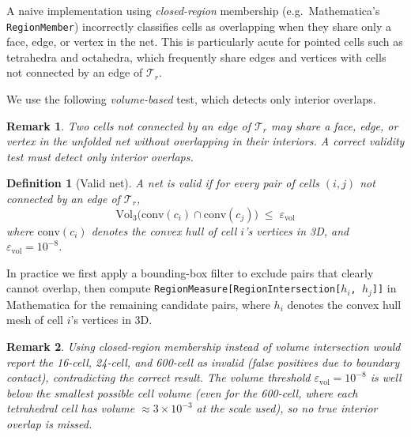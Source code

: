 \documentclass[11pt,letterpaper]{article}
\newtheorem{remark}{Remark}
\newtheorem{definition}{Definition}
\newcommand{\eps}{\varepsilon}
\begin{document}

A naive implementation using \emph{closed-region} membership
(e.g.\ Mathematica's \texttt{RegionMember}) incorrectly classifies
cells as overlapping when they share only a face, edge, or vertex
in the net.
This is particularly acute for pointed cells such as tetrahedra and
octahedra, which frequently share edges and vertices with
cells not connected by an edge of $\mathcal{T}_r$.

We use the following \emph{volume-based} test, which detects only
interior overlaps.

\begin{remark}
Two cells not connected by an edge of $\mathcal{T}_r$ may share a face, edge,
or vertex in the unfolded net without overlapping in their interiors.
A correct validity test must detect only \emph{interior} overlaps.
\end{remark}

\begin{definition}[Valid net]\label{def:valid}
A net is \emph{valid} if for every pair of cells $(i,j)$ not
connected by an edge of $\mathcal{T}_r$,
\[
  \mathrm{Vol}_3\!\bigl(\mathrm{conv}(c_i)\cap\mathrm{conv}(c_j)\bigr)
  \;\le\; \eps_{\mathrm{vol}}
\]
where $\mathrm{conv}(c_i)$ denotes the convex hull of cell $i$'s
vertices in 3D, and $\eps_{\mathrm{vol}} = 10^{-8}$.
\end{definition}

\noindent
In practice we first apply a bounding-box filter to exclude pairs
that clearly cannot overlap, then compute
\texttt{RegionMeasure[\allowbreak RegionIntersection[$h_i$, $h_j$]]}
in Mathematica for the remaining candidate pairs,
where $h_i$ denotes the convex hull mesh of cell $i$'s vertices in 3D.

\begin{remark}
Using closed-region membership instead of volume intersection would
report the 16-cell, 24-cell, and 600-cell as invalid (false positives
due to boundary contact), contradicting the correct result.
The volume threshold $\eps_{\mathrm{vol}} = 10^{-8}$ is
well below the smallest possible cell volume (even for the 600-cell,
where each tetrahedral cell has volume $\approx 3\times10^{-3}$
at the scale used), so no true interior overlap is missed.
\end{remark}
\end{document}
